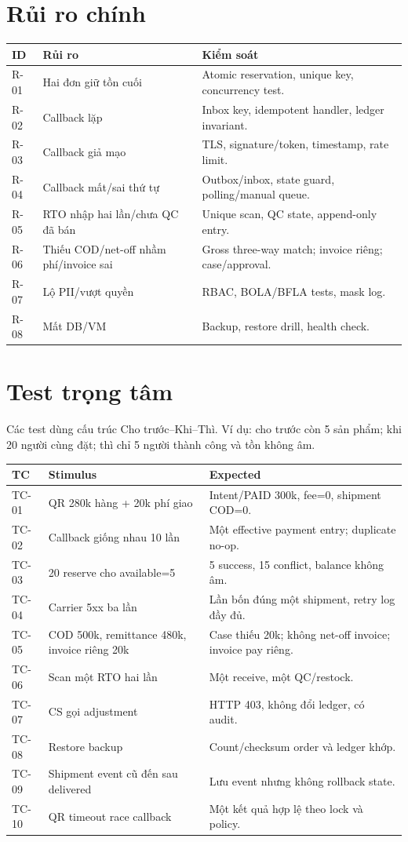 \documentclass[12pt,a4paper]{report}
\begin{document}
\section{Rủi ro chính}
\begin{longtable}{p{}p{}p{}}
\toprule
\textbf{ID} & \textbf{Rủi ro} & \textbf{Kiểm soát}\\
\midrule\endhead
R-01 & Hai đơn giữ tồn cuối & Atomic reservation, unique key, concurrency test.\\
R-02 & Callback lặp & Inbox key, idempotent handler, ledger invariant.\\
R-03 & Callback giả mạo & TLS, signature/token, timestamp, rate limit.\\
R-04 & Callback mất/sai thứ tự & Outbox/inbox, state guard, polling/manual queue.\\
R-05 & RTO nhập hai lần/chưa QC đã bán & Unique scan, QC state, append-only entry.\\
R-06 & Thiếu COD/net-off nhầm phí/invoice sai & Gross three-way match; invoice riêng; case/approval.\\
R-07 & Lộ PII/vượt quyền & RBAC, BOLA/BFLA tests, mask log.\\
R-08 & Mất DB/VM & Backup, restore drill, health check.\\
\bottomrule
\end{longtable}

\section{Test trọng tâm}
Các test dùng cấu trúc Cho trước--Khi--Thì. Ví dụ: cho trước còn 5 sản phẩm; khi 20 người cùng đặt; thì chỉ 5 người thành công và tồn không âm.
\begin{longtable}{p{}p{}p{}}
\toprule
\textbf{TC} & \textbf{Stimulus} & \textbf{Expected}\\
\midrule\endhead
TC-01 & QR 280k hàng + 20k phí giao & Intent/PAID 300k, fee=0, shipment COD=0.\\
TC-02 & Callback giống nhau 10 lần & Một effective payment entry; duplicate no-op.\\
TC-03 & 20 reserve cho available=5 & 5 success, 15 conflict, balance không âm.\\
TC-04 & Carrier 5xx ba lần & Lần bốn đúng một shipment, retry log đầy đủ.\\
TC-05 & COD 500k, remittance 480k, invoice riêng 20k & Case thiếu 20k; không net-off invoice; invoice pay riêng.\\
TC-06 & Scan một RTO hai lần & Một receive, một QC/restock.\\
TC-07 & CS gọi adjustment & HTTP 403, không đổi ledger, có audit.\\
TC-08 & Restore backup & Count/checksum order và ledger khớp.\\
TC-09 & Shipment event cũ đến sau delivered & Lưu event nhưng không rollback state.\\
TC-10 & QR timeout race callback & Một kết quả hợp lệ theo lock và policy.\\
\bottomrule
\end{longtable}
\end{document}
